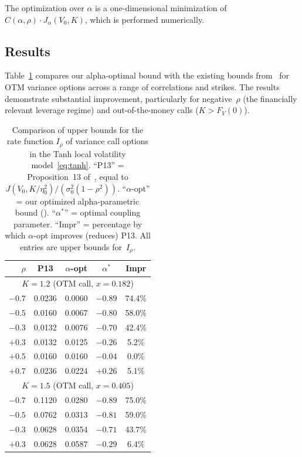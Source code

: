 \documentclass[12pt]{article}
\begin{document}
The optimization over $\alpha$ is a one-dimensional minimization of
$C(\alpha,\rho)\cdot J_\alpha(V_0,K)$, which is performed numerically.

\subsection{Results}

Table~\ref{tab:comparison} compares our alpha-optimal bound with the existing bounds
from~\cite{PWZ2025} for OTM variance options across a range of correlations and strikes.
The results demonstrate substantial improvement, particularly for negative~$\rho$ (the
financially relevant leverage regime) and out-of-the-money calls ($K > F_V(0)$).

\begin{table}[h!]
\centering
\caption{Comparison of upper bounds for the rate function $I_\rho$ of variance call
options in the Tanh local volatility model~\eqref{eq:tanh}. ``P13'' = Proposition~13
of~\cite{PWZ2025}, equal to $J(V_0,K/\eta_0^2)/(\sigma_0^2(1-\rho^2))$.
``$\alpha$-opt'' = our optimized alpha-parametric bound ().
``$\alpha^*$'' = optimal coupling parameter. ``Impr'' = percentage by which
$\alpha$-opt improves (reduces) P13. All entries are upper bounds for~$I_\rho$.}
\label{tab:comparison}
\small
\begin{tabular}{r|c|cc|c}
\hline
$\rho$ & P13 & $\alpha$-opt & $\alpha^*$ & Impr \\
\hline
\multicolumn{5}{c}{$K=1.2$ (OTM call, $x=0.182$)} \\
\hline
$-0.7$ & 0.0236 & 0.0060 & $-0.89$ & 74.4\% \\
$-0.5$ & 0.0160 & 0.0067 & $-0.80$ & 58.0\% \\
$-0.3$ & 0.0132 & 0.0076 & $-0.70$ & 42.4\% \\
$+0.3$ & 0.0132 & 0.0125 & $-0.26$ & 5.2\% \\
$+0.5$ & 0.0160 & 0.0160 & $-0.04$ & 0.0\% \\
$+0.7$ & 0.0236 & 0.0224 & $+0.26$ & 5.1\% \\
\hline
\multicolumn{5}{c}{$K=1.5$ (OTM call, $x=0.405$)} \\
\hline
$-0.7$ & 0.1120 & 0.0280 & $-0.89$ & 75.0\% \\
$-0.5$ & 0.0762 & 0.0313 & $-0.81$ & 59.0\% \\
$-0.3$ & 0.0628 & 0.0354 & $-0.71$ & 43.7\% \\
$+0.3$ & 0.0628 & 0.0587 & $-0.29$ & 6.4\% \\

\end{tabular}
\end{table}
\end{document}

